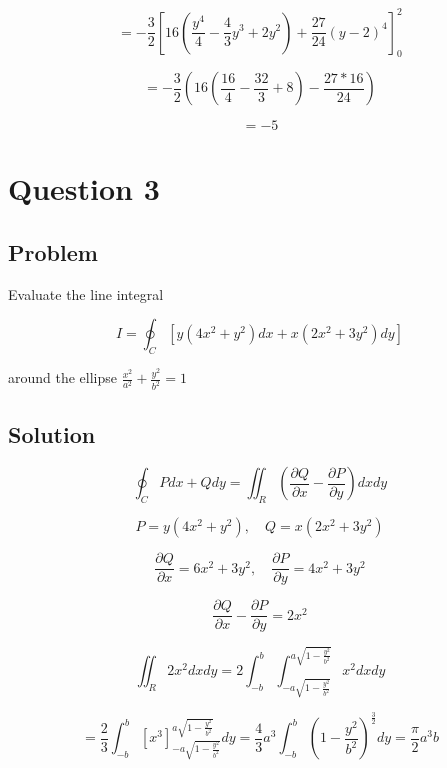 \documentclass[12pt]{article}
\begin{document}
\[
    = - \frac{3}{2} {\left[16 \left(\frac{y^4}{4}-\frac{4}{3}y^3+2y^2\right) + \frac{27}{24} {\left(y - 2\right)}^4\right] }_0^2
\]

\[
    = - \frac{3}{2} \left(16 \left(\frac{16}{4}-\frac{32}{3}+8\right) - \frac{27*16}{24}\right)
\]

\[
    = - 5
\]

\newpage
\section{Question 3}

\subsection{Problem}

Evaluate the line integral

\[
    I=\oint_C\left[y\left(4 x^2+y^2\right) d x+x\left(2 x^2+3 y^2\right) d y\right]
\]

around the ellipse \(\frac{x^2}{a^2}+\frac{y^2}{b^2}=1\)

\subsection{Solution}

\[
    \oint_C P d x+Q d y=\iint_R\left(\frac{\partial Q}{\partial x}-\frac{\partial P}{\partial y}\right) d x d y
\]

\[
    P = y\left(4 x^2+y^2\right), \quad Q = x\left(2 x^2+3 y^2\right)
\]

\[
    \frac{\partial Q}{\partial x} = 6x^2 + 3 y^2, \quad \frac{\partial P}{\partial y} = 4 x^2 + 3 y^2
\]

\[
    \frac{\partial Q}{\partial x} - \frac{\partial P}{\partial y} = 2 x^2
\]

\[
    \iint_R 2 x^2 d x d y
    = 2 \int_{-b}^{b} \int_{-a \sqrt{1 - \frac{y^2}{b^2}}}^{a \sqrt{1 - \frac{y^2}{b^2}}} x^2 d x d y
\]

\[
    = \frac{2}{3} \int_{-b}^{b} {\left[ x^3 \right]}_{-a \sqrt{1 - \frac{y^2}{b^2}}}^{a \sqrt{1 - \frac{y^2}{b^2}}} d y
    = \frac{4}{3} a^3 \int_{-b}^{b} {\left(1 - \frac{y^2}{b^2}\right) }^\frac{3}{2} d y
    = \frac{\pi}{2} a^3 b
\]

\newpage


\nocite{El-Deeb_PEU-218_Assignments}
\end{document}
